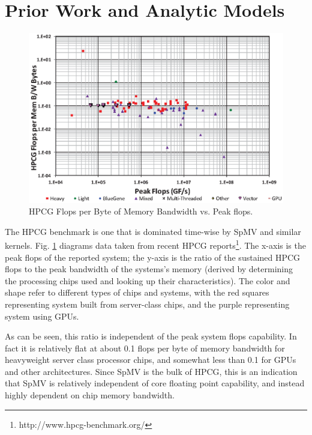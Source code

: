 \section{Prior Work and Analytic Models}\label{sec:dspmv-relatedwork}

\begin{figure}\begin{centering}
		\includegraphics[scale=0.85]{figures/spmv-historical-hpcg-bw.eps}
		\caption{HPCG Flops per Byte of Memory Bandwidth vs. Peak flops.}
		\label{fig:spmv-historical-hpcg-bw}
\end{centering}\end{figure}

The HPCG benchmark \cite{techbib:hpcg-snl-dongarra} is one that is dominated time-wise by SpMV and similar kernels. Fig. \ref{fig:spmv-historical-hpcg-bw} diagrams data taken from recent HPCG reports\footnote{http://www.hpcg-benchmark.org/}. The x-axis is the peak flops of the reported system; the y-axis is the ratio of the sustained HPCG flops to the peak bandwidth of the systems's memory (derived by determining the processing chips used and looking up their characteristics). The color and shape refer to different types of chips and systems, with the red squares representing system built from server-class chips, and the purple representing system using GPUs. 

As can be seen, this ratio is independent of the peak system flops capability. In fact it is relatively flat at about 0.1 flops per byte of memory bandwidth for heavyweight server class processor chips, and somewhat less than 0.1 for GPUs and other architectures. Since SpMV is the bulk of HPCG, this is an indication that SpMV is relatively independent of core floating point capability, and instead highly dependent on chip memory bandwidth.

